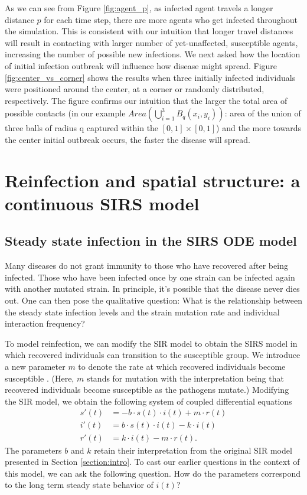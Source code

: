 \documentclass[12pt, reqno]{amsart}
\begin{document}
    As we can see from Figure \ref{fig:agent_p}, as infected agent travels a longer distance \(p\) for each time step, there are more agents who get infected throughout the simulation. This is consistent with our intuition that longer travel distances will result in contacting with larger number of yet-unaffected, susceptible agents, increasing the number of possible new infections.
    We next asked how the location of initial infection outbreak will influence how disease might spread. Figure \ref{fig:center_vs_corner} shows the results when three initially infected individuals were positioned around the center, at a corner or randomly distributed, respectively. The figure confirms our intuition that the larger the total area of possible contacts (in our example \(Area(\bigcup_{i=1}^{3} B_{q}(x_{i}, y_{i}))\): area of the union of three balls of radius q captured within the \([0,1]\times[0,1]\)) and the more towards the center initial outbreak occurs, the faster the disease will spread.   

    \section{Reinfection and spatial structure: a continuous SIRS model}\label{section:SIRS_model}

    \subsection{Steady state infection in the SIRS ODE model}
    Many diseases do not grant immunity to those who have recovered after being infected. Those who have been infected once by one strain can be infected again with another mutated strain. In principle, it's possible that the disease never dies out. One can then pose the qualitative question: What is the relationship between the steady state infection levels and the strain mutation rate and individual interaction frequency?
    
    To model reinfection, we can modify the SIR model to obtain the SIRS model in which recovered individuals can transition to the susceptible group. We introduce a new parameter \(m\) to denote the rate at which recovered individuals become susceptible \cite{brauerCompartmentalModelsEpidemiology2008}. (Here, \(m\) stands for mutation with the interpretation being that recovered individuals become susceptible as the pathogens mutate.) Modifying the SIR model, we obtain the following system of coupled differential equations 
    \begin{align*}
        s'(t) &= -b\cdot s(t) \cdot i(t) + m\cdot r(t) \\
        i'(t) &= b \cdot s(t) \cdot i(t) - k\cdot i(t) \\
        r'(t) &= k \cdot i(t) - m \cdot r(t).
    \end{align*}
    The parameters \(b\) and \(k\) retain their interpretation from the original SIR model presented in Section \ref{section:intro}. To cast our earlier questions in the context of this model, we can ask the following question. How do the parameters correspond to the long term steady state behavior of \(i(t)\)? 
    
\end{document}
